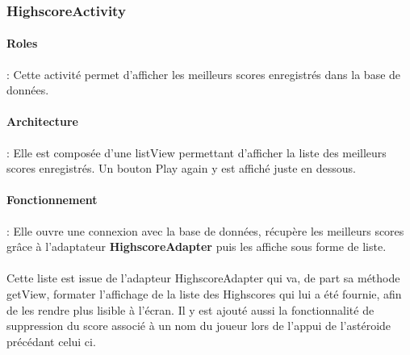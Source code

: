 \documentclass{article}
\begin{document}
\subsubsection{HighscoreActivity}
\paragraph{Roles}: Cette activité permet d'afficher les meilleurs scores enregistrés dans la base de données.
\paragraph{Architecture}: Elle est composée d'une listView permettant d'afficher la liste des meilleurs scores enregistrés. Un bouton Play again y est affiché juste en dessous.
\paragraph{Fonctionnement}: Elle ouvre une connexion avec la base de données, récupère les meilleurs scores grâce à l'adaptateur \textbf{HighscoreAdapter} puis les affiche sous forme de liste.
\paragraph{}Cette liste est issue de l'adapteur HighscoreAdapter qui va, de part sa méthode getView, formater l'affichage de la liste des Highscores qui lui a été fournie, afin de les rendre plus lisible à l'écran.
Il y est ajouté aussi la fonctionnalité de suppression du score associé à un nom du joueur lors de l'appui de l'astéroide précédant celui ci.
\end{document}

